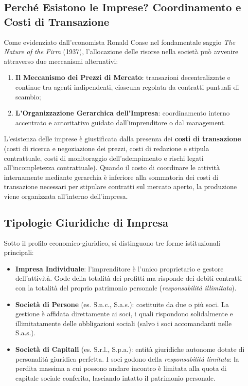 \subsection{Perché Esistono le Imprese? Coordinamento e Costi di Transazione}
Come evidenziato dall'economista Ronald Coase nel fondamentale saggio \textit{The Nature of the Firm} (1937), l'allocazione delle risorse nella società può avvenire attraverso due meccanismi alternativi:
\begin{enumerate}
    \item \textbf{Il Meccanismo dei Prezzi di Mercato}: transazioni decentralizzate e continue tra agenti indipendenti, ciascuna regolata da contratti puntuali di scambio;
    \item \textbf{L'Organizzazione Gerarchica dell'Impresa}: coordinamento interno accentrato e autoritativo guidato dall'imprenditore o dal management.
\end{enumerate}
L'esistenza delle imprese è giustificata dalla presenza dei \textbf{costi di transazione} (costi di ricerca e negoziazione dei prezzi, costi di redazione e stipula contrattuale, costi di monitoraggio dell'adempimento e rischi legati all'incompletezza contrattuale). Quando il costo di coordinare le attività internamente mediante gerarchia è inferiore alla sommatoria dei costi di transazione necessari per stipulare contratti sul mercato aperto, la produzione viene organizzata all'interno dell'impresa.

\subsection{Tipologie Giuridiche di Impresa}
Sotto il profilo economico-giuridico, si distinguono tre forme istituzionali principali:
\begin{itemize}
    \item \textbf{Impresa Individuale}: l'imprenditore è l'unico proprietario e gestore dell'attività. Gode della totalità dei profitti ma risponde dei debiti contratti con la totalità del proprio patrimonio personale (\textit{responsabilità illimitata}).
    \item \textbf{Società di Persone} (es. S.n.c., S.a.s.): costituite da due o più soci. La gestione è affidata direttamente ai soci, i quali rispondono solidalmente e illimitatamente delle obbligazioni sociali (salvo i soci accomandanti nelle S.a.s.).
    \item \textbf{Società di Capitali} (es. S.r.l., S.p.a.): entità giuridiche autonome dotate di personalità giuridica perfetta. I soci godono della \textit{responsabilità limitata}: la perdita massima a cui possono andare incontro è limitata alla quota di capitale sociale conferita, lasciando intatto il patrimonio personale.
\end{itemize}

